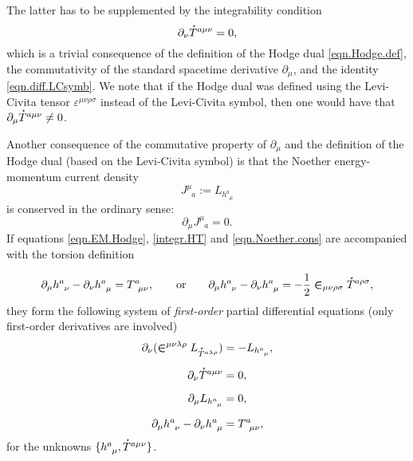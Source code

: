 \documentclass[
10pt, %
a4paper, %
oneside, %
headinclude,footinclude, %
BCOR5mm, %
]{scrartcl}
\newcommand{\IP}[1]{{\color{Red}[IP:\ \ #1]}}
\newcommand{\pd}[1]{\partial_{#1}}
\newcommand{\tetrsymbol}{h}
\newcommand{\tetr}[2]{\tetrsymbol^{#1}_{\phantom{#1}#2}}
\newcommand{\D}[1]{\partial_{#1}} %
\newcommand{\Tors}[2]{T^{#1}_{\phantom{a}#2}}
\newcommand{\Laghodge}{L}%
\newcommand{\LCsymb}{\bm{\in}}    %
\newcommand{\LCtens}{\varepsilon} %
\newcommand{\HDT}[1]{\accentset{\star}{T}^{#1}}
\newcommand{\NC}[2]{J^{#2}_{\phantom{#2}#1}}
\begin{document}
The latter has to be supplemented by the integrability 
condition
\begin{equation}\label{integr.HT}
\D{\nu}\HDT{a\mu\nu} = 0,
\end{equation}
which is a trivial consequence of the definition of the  Hodge dual \eqref{eqn.Hodge.def}, the 
commutativity of the standard spacetime derivative $ \D{\mu} $, and the 
identity \eqref{eqn.diff.LCsymb}.
We note that if the Hodge dual was defined using the Levi-Civita tensor $ 
\LCtens^{\mu\nu\rho\sigma} $ instead of the Levi-Civita symbol, then one would 
have that $ \D{\mu}\HDT{a\mu\nu} \neq 0 $.

Another consequence of the commutative property of $ \pd{\mu} $ and the definition of the Hodge 
dual (based on the Levi-Civita symbol) is that the Noether energy-momentum 
current density
\begin{equation}\label{eqn.Noether.current}
	\NC{a}{\mu} := \Laghodge_{\tetr{a}{\mu}}
\end{equation}
is conserved in the ordinary sense:
\begin{equation}\label{eqn.Noether.cons}
\D{\mu} \NC{a}{\mu} = 0.
\end{equation}
If  equations \eqref{eqn.EM.Hodge}, \eqref{integr.HT} and \eqref{eqn.Noether.cons} are accompanied 
with the 
torsion definition

\begin{equation}\label{eqn.tetr}
	\D{\mu}\tetr{a}{\nu} - \D{\nu}\tetr{a}{\mu} = \Tors{a}{\mu\nu},
	\qquad
	\text{or}
	\qquad
	\D{\mu}\tetr{a}{\nu} - \D{\nu}\tetr{a}{\mu} =-\frac12 
	\LCsymb_{\mu\nu\rho\sigma} \HDT{a\rho\sigma},
\end{equation}
they form the following system of \emph{first-order} partial differential
equations (only first-order derivatives are involved)
\begin{subequations}\label{eqn.1st.order.TEGR}
	\begin{align}	
	\D{\nu}(\LCsymb^{\mu\nu\lambda\rho}\Laghodge_{\HDT{a\lambda\rho}}) 
	&=-\Laghodge_{\tetr{a}{\mu}},\label{eqn.TEGR0.EL}\\[2mm]
	\D{\nu}\HDT{a\mu\nu} & = 0,\label{eqn.TEGR0.integr}\\[2mm]
	\D{\mu}\Laghodge_{\tetr{a}{\mu}} & = 0,\label{eqn.TEGR0.enermomen}\\[2mm]
	\D{\mu}\tetr{a}{\nu} - \D{\nu}\tetr{a}{\mu} &= \Tors{a}{\mu\nu},\label{eqn.TEGR0.tetrad}
	\end{align}
\end{subequations}
for the unknowns $ \{\tetr{a}{\mu},\HDT{a\mu\nu}\} $.
\end{document}
